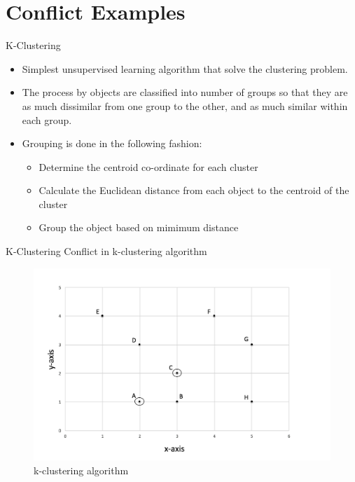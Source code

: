 \section{Conflict Examples}
\begin{frame}{K-Clustering}
  \begin{itemize}
    \item Simplest unsupervised learning algorithm that solve the clustering problem.
    \item The process by objects are classified into number of groups so that they are as much dissimilar from one group to the other,
          and as much similar within each group.
    \item Grouping is done in the following fashion:
          \begin{itemize}
            \item Determine the centroid co-ordinate for each cluster
            \item Calculate the Euclidean distance from each object to the centroid of the cluster
            \item Group the object based on mimimum distance
          \end{itemize}
  \end{itemize}
\end{frame}

\begin{frame}{K-Clustering}
	Conflict in k-clustering algorithm
			\begin{figure}
			\includegraphics[width=0.8\linewidth]{figures/k-cluster.jpg}
			\caption{k-clustering algorithm}
			\end{figure}
\end{frame}

